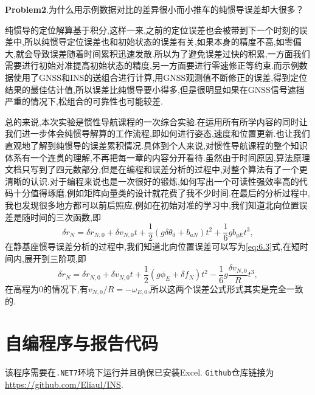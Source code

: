 \documentclass[10pt,a4paper]{ctexart}
\begin{document}
\noindent\textbf{Problem2}.为什么用示例数据对比的差异很小而小推车的纯惯导误差却大很多？

\noindent 纯惯导的定位解算基于积分,这样一来,之前的定位误差也会被带到下一个时刻的误差中,所以纯惯导定位误差也和初始状态的误差有关,如果\IMU 本身的精度不高,如零偏大,就会导致误差随着时间累积迅速发散.所以为了避免误差过快的积累,一方面我们需要进行初始对准提高初始状态的精度,另一方面要进行零速修正等约束.而示例数据使用了\textsf{GNSS}和\textsf{INS}的送组合进行计算,用\textsf{GNSS}观测值不断修正\IMU 的误差,得到定位结果的最佳估计值,所以误差比纯惯导要小得多,但是很明显如果在\textsf{GNSS}信号遮挡严重的情况下,松组合的可靠性也可能较差.

总的来说,本次实验是惯性导航课程的一次综合实验.在运用所有所学内容的同时让我们进一步体会纯惯导解算的工作流程,即如何进行姿态,速度和位置更新.也让我们直观地了解到纯惯导的误差累积情况.具体到个人来说,对惯性导航课程的整个知识体系有一个连贯的理解,不再把每一章的内容分开看待.虽然由于时间原因,算法原理文档只写到了四元数部分,但是在编程和误差分析的过程中,对整个算法有了一个更清晰的认识.对于编程来说也是一次很好的锻炼,如何写出一个可读性强效率高的代码十分值得琢磨,例如矩阵向量类的设计就花费了我不少时间.在最后的分析过程中,我也发现很多地方都可以前后照应,例如在初始对准的学习中,我们知道北向位置误差是随时间的三次函数,即
\[
    \delta r_N =\delta r_{N,0} +\delta v_{N,0}t + \frac{1}{2}(g\delta \theta_0 + b_{aN})t^2 + \frac{1}{6}gb_{gE}t^3,
\]
在静基座惯导误差分析的过程中,我们知道北向位置误差可以写为\eqref{eq:6.3}式,在短时间内,展开到三阶项,即
\[
    \delta r_N =\delta r_{N,0} +\delta v_{N,0}t + \frac{1}{2}(g\phi_E +\delta f_N)t^2 - \frac{1}{6}g\frac{\delta v_{N,0}}{R} t^3,
\]
在高程为$0$的情况下,有$v_{N,0}/R=-\omega_{E,0}$,所以这两个误差公式形式其实是完全一致的.

\appendix
\section{自编程序与报告代码}
\noindent 该程序需要在\texttt{.NET7}环境下运行并且确保已安装\textsf{Excel}. \texttt{Github}\hspace{0mm}仓库链接为\url{https://github.com/Eliaul/INS}.
\end{document}
